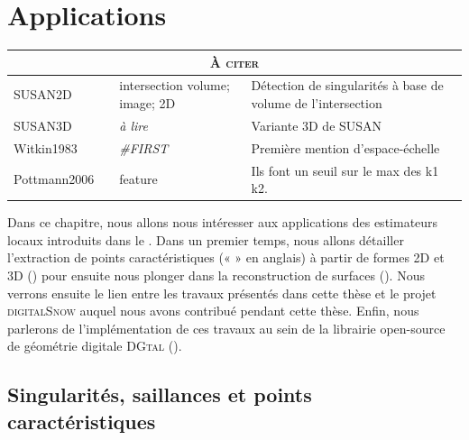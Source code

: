 %
\chapter{Applications}
\label{sec:applications}


\setcounter{minitocdepth}{3}
\minitoc

\newpage

\begin{table}[h]
\begin{tabular}{@{}p{2cm}lp{2cm}p{8cm}@{}}
\toprule
\multicolumn{4}{c}{\textsc{À citer}} \\ \midrule
SUSAN2D & \cite{SUSAN2D} & intersection volume; image; 2D     & Détection de singularités à base de volume de l'intersection \\
SUSAN3D & \cite{SUSAN3D} & \emph{à lire} & Variante 3D de SUSAN \\
Witkin1983 & \cite{Witkin1983} & \emph{\#FIRST} & Première mention d'espace-échelle \\
Pottmann2006 & \cite{Yang2006} & feature & Ils font un seuil sur le max des k1 k2. \\

\bottomrule
\end{tabular}
\end{table}

\newpage

Dans ce chapitre, nous allons nous intéresser aux applications des estimateurs
locaux introduits dans le . Dans un premier temps,
nous allons détailler l'extraction de points caractéristiques («
 » en anglais) à partir de formes 2D et 3D
() pour ensuite nous plonger dans la
reconstruction de surfaces (). Nous
verrons ensuite le lien entre les travaux présentés dans cette thèse et le
projet \textsc{digitalSnow} auquel nous avons contribué pendant cette thèse.
Enfin, nous parlerons de l'implémentation de ces travaux au sein de la librairie
open-source de géométrie digitale \textsc{DGtal}\cite{DGtal}
().

\section{Singularités, saillances et points caractéristiques}
\label{sec:applications:feature}

